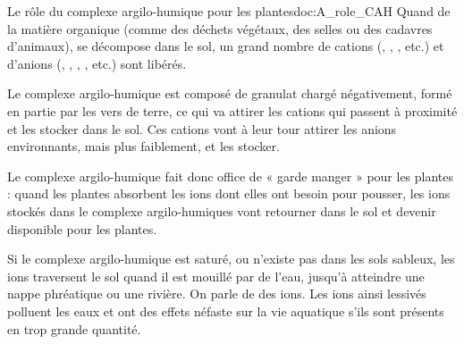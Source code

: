\begin{doc}{Le rôle du complexe argilo-humique pour les plantes}{doc:A_role_CAH}
  Quand de la matière organique (comme des déchets végétaux, des selles ou des cadavres d'animaux), se décompose dans le sol, un grand nombre de cations (\ionPotassium, \ionSodium, \ammonium, etc.) et d'anions (\ionPhosphate, \nitrate, \nitrite, \sulfate, etc.) sont libérés.

  Le complexe argilo-humique est composé de granulat chargé négativement, formé en partie par les vers de terre, ce qui va attirer les cations qui passent à proximité et les stocker dans le sol. 
  Ces cations vont à leur tour attirer les anions environnants, mais plus faiblement, et les stocker.

  \begin{importants}
    Le complexe argilo-humique fait donc office de « garde manger » pour les plantes : quand les plantes absorbent les ions dont elles ont besoin pour pousser, les ions stockés dans le complexe argilo-humiques vont retourner dans le sol et devenir disponible pour les plantes.
  \end{importants}

  Si le complexe argilo-humique est saturé, ou n'existe pas dans les sols sableux, les ions traversent le sol quand il est mouillé par de l'eau, jusqu'à atteindre une nappe phréatique ou une rivière.
  On parle de  des ions.
  Les ions ainsi lessivés polluent les eaux et ont des effets néfaste sur la vie aquatique s'ils sont présents en trop grande quantité.
\end{doc}

